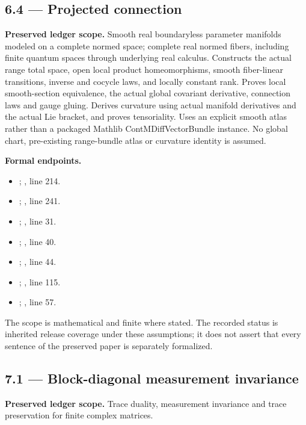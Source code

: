 \subsection{6.4 — Projected connection}
\label{result:6.4}
\textbf{Preserved ledger scope.} Smooth real boundaryless parameter manifolds modeled on a complete normed space; complete real normed fibers, including finite quantum spaces through underlying real calculus. Constructs the actual range total space, open local product homeomorphisms, smooth fiber-linear transitions, inverse and cocycle laws, and locally constant rank. Proves local smooth-section equivalence, the actual global covariant derivative, connection laws and gauge gluing. Derives curvature using actual manifold derivatives and the actual Lie bracket, and proves tensoriality. Uses an explicit smooth atlas rather than a packaged Mathlib ContMDiffVectorBundle instance. No global chart, pre-existing range-bundle atlas or curvature identity is assumed.

\textbf{Formal endpoints.}\begin{itemize}
\item {}; , line 214.
\item {}; , line 241.
\item {}; , line 31.
\item {}; , line 40.
\item {}; , line 44.
\item {}; , line 115.
\item {}; , line 57.
\end{itemize}
The scope is mathematical and finite where stated. The recorded status is inherited release coverage under these assumptions; it does not assert that every sentence of the preserved paper is separately formalized.

\subsection{7.1 — Block-diagonal measurement invariance}
\label{result:7.1}
\textbf{Preserved ledger scope.} Trace duality, measurement invariance and trace preservation for finite complex matrices.

